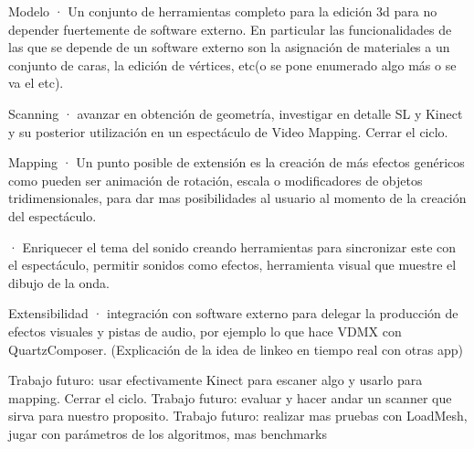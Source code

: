 Modelo
· Un conjunto de herramientas completo para la edición 3d para no depender fuertemente de software externo. En particular las funcionalidades de las que se depende de un software externo son la asignación de materiales a un conjunto de caras, la edición de vértices, etc(o se pone enumerado algo más o se va el etc).

Scanning
· avanzar en obtención de geometría, investigar en detalle SL y Kinect y su posterior utilización en un espectáculo de Video Mapping. Cerrar el ciclo.

Mapping
· Un punto posible de extensión es la creación de más efectos genéricos como pueden ser animación de rotación, escala o modificadores de objetos tridimensionales, para dar mas posibilidades al usuario al momento de la creación del espectáculo.

· Enriquecer el tema del sonido creando herramientas para sincronizar este con el espectáculo, permitir sonidos como efectos, herramienta visual que muestre el dibujo de la onda.

Extensibilidad
· integración con software externo para delegar la producción de efectos visuales y pistas de audio, por ejemplo lo que hace VDMX con QuartzComposer. (Explicación de la idea de linkeo en tiempo real con otras app)

Trabajo futuro: usar efectivamente Kinect para escaner algo y usarlo para mapping. Cerrar el ciclo.
Trabajo futuro: evaluar y hacer andar un scanner que sirva para nuestro proposito.
Trabajo futuro: realizar mas pruebas con LoadMesh, jugar con parámetros de los algoritmos, mas benchmarks